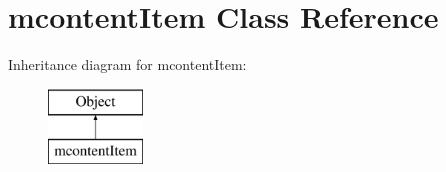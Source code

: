 \hypertarget{classmcontentItem}{\section{mcontent\+Item Class Reference}
\label{classmcontentItem}
}
Inheritance diagram for mcontent\+Item\+:\begin{figure}[H]
\begin{center}
\leavevmode
\includegraphics[height=2.000000cm]{classmcontentItem}
\end{center}
\end{figure}
